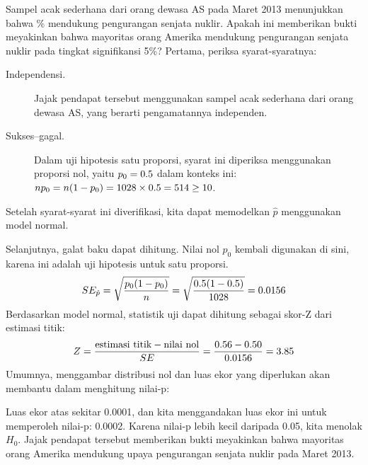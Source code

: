 \begin{examplewrap}
\begin{nexample}{Sampel acak sederhana dari
    \gallupnucleararmspollsize{} orang dewasa AS
    pada Maret 2013 menunjukkan bahwa
    \gallupnucleararmspollpercent{}\% mendukung pengurangan
    senjata nuklir.
    Apakah ini memberikan bukti meyakinkan bahwa mayoritas
    orang Amerika mendukung pengurangan senjata nuklir pada
    tingkat signifikansi 5\%?} \label{NuclearArmsInferenceExample}
  Pertama, periksa syarat-syaratnya:
  \begin{description}
  \item[Independensi.] Jajak pendapat tersebut menggunakan sampel acak sederhana
      dari orang dewasa AS, yang berarti pengamatannya independen.
  \item[Sukses--gagal.] Dalam uji hipotesis satu proporsi,
      syarat ini diperiksa menggunakan proporsi nol,
      yaitu $p_0 = 0.5{}$
      dalam konteks ini:
      $n p_0 = n (1 - p_0)
          = 1028{} \times
              0.5{}
          = 514{} \geq 10$.
  \end{description}
  Setelah syarat-syarat ini diverifikasi,
  kita dapat memodelkan $\hat{p}$ menggunakan model normal.

  Selanjutnya, galat baku dapat dihitung.
  Nilai nol $p_0$ kembali digunakan di sini,
  karena ini adalah uji hipotesis untuk satu proporsi.
  \begin{align*}
  SE_{\hat{p}}
      = \sqrt{\frac{p_0 (1 - p_0)}{n}}
      = \sqrt{\frac{0.5{}
          (1 - 0.5{})}
          {1028{}}}
      = 0.0156{}
  \end{align*}
  Berdasarkan model normal, statistik uji dapat
  dihitung sebagai skor-Z dari estimasi titik:
  \begin{align*}
  Z = \frac{\text{estimasi titik} - \text{nilai nol}}{SE}
      = \frac{0.56{} - 0.50}
          {0.0156{}}
      = 3.85
  \end{align*}
  Umumnya, menggambar distribusi nol dan
  luas ekor yang diperlukan akan membantu dalam menghitung nilai-p:
  \begin{center}
  \end{center}
  Luas ekor atas sekitar 0.0001,
  dan kita menggandakan luas ekor ini untuk memperoleh nilai-p: 0.0002.
  Karena nilai-p lebih kecil daripada 0.05, kita menolak $H_0$.
  Jajak pendapat tersebut memberikan bukti meyakinkan bahwa mayoritas
  orang Amerika mendukung upaya pengurangan senjata nuklir
  pada Maret 2013.
\end{nexample}
\end{examplewrap}

